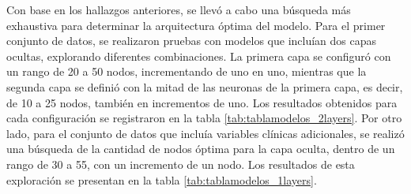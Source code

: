Con base en los hallazgos anteriores, se llevó a cabo una búsqueda más exhaustiva para determinar la 
arquitectura óptima del modelo. Para el primer conjunto de datos, se realizaron pruebas con modelos 
que incluían dos capas ocultas, explorando diferentes combinaciones. La primera capa se configuró 
con un rango de 20 a 50 nodos, incrementando de uno en uno, mientras que la segunda capa se definió 
con la mitad de las neuronas de la primera capa, es decir, de 10 a 25 nodos, también en incrementos 
de uno. Los resultados obtenidos para cada configuración se registraron en la tabla \ref{tab:tablamodelos_2layers}. 
Por otro lado, para el conjunto de datos que incluía variables clínicas adicionales, se realizó una 
búsqueda de la cantidad de nodos óptima para la capa oculta, dentro de un rango de 30 a 55, con un 
incremento de un nodo. Los resultados de esta exploración se presentan en la tabla \ref{tab:tablamodelos_1layers}.

